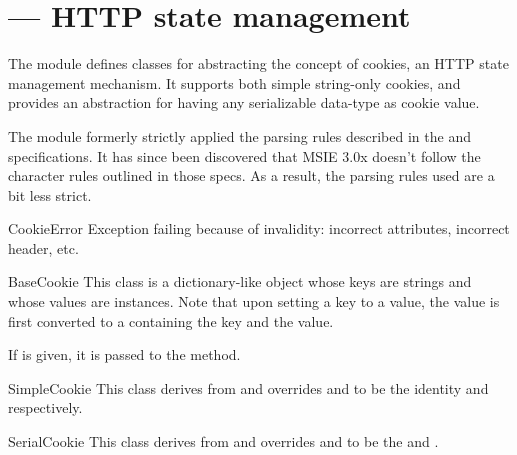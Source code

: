 \section{ ---
         HTTP state management}



The  module defines classes for abstracting the concept of 
cookies, an HTTP state management mechanism. It supports both simple
string-only cookies, and provides an abstraction for having any serializable
data-type as cookie value.

The module formerly strictly applied the parsing rules described in
the  and  specifications.  It has since been discovered
that MSIE 3.0x doesn't follow the character rules outlined in those
specs.  As a result, the parsing rules used are a bit less strict.

\begin{excdesc}{CookieError}
Exception failing because of  invalidity: incorrect
attributes, incorrect  header, etc.
\end{excdesc}

\begin{classdesc}{BaseCookie}{}
This class is a dictionary-like object whose keys are strings and
whose values are  instances. Note that upon setting a key to
a value, the value is first converted to a  containing
the key and the value.

If  is given, it is passed to the  method.
\end{classdesc}

\begin{classdesc}{SimpleCookie}{}
This class derives from  and overrides
 and  to be the identity
and  respectively.
\end{classdesc}

\begin{classdesc}{SerialCookie}{}
This class derives from  and overrides
 and  to be the
 and .

\end{classdesc}

